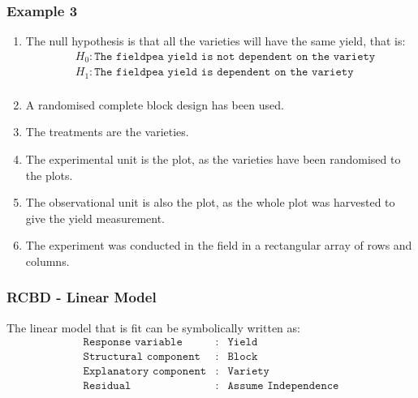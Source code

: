 \begin{frame}\frametitle{Example 3}
\begin{enumerate}
\item The null hypothesis is that all the varieties will have the same yield, that is:
\begin{align*}
& H_0: \texttt{The fieldpea yield is not dependent on the variety}\\
& H_1:\texttt{The fieldpea yield is dependent on the variety}\\
\end{align*}
\item A randomised complete block design has been used. \\
\item The treatments are the varieties.\\
\item The experimental unit is the plot, as the varieties have been randomised to the plots.\\
\item The observational unit is also the plot, as the whole plot was harvested to give the yield measurement.\\
\item The experiment was conducted in the field in a rectangular array of rows and columns.\\
\end{enumerate}

\end{frame}


\begin{frame}\frametitle{RCBD - Linear Model}
The linear model that is fit can be symbolically written as:
\begin{eqnarray*}
	\texttt{Response variable}&:& \texttt{Yield} \\
	\texttt{Structural component}&:& \texttt{Block}\\
	\texttt{Explanatory component}&:& \texttt{Variety}\\
	\texttt{Residual}&:& \texttt{Assume Independence}
\end{eqnarray*}
\end{frame}




